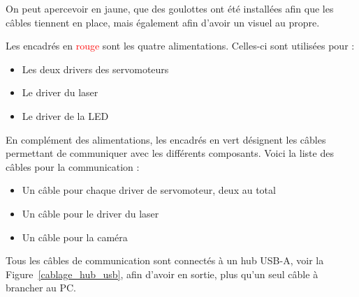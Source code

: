 On peut apercevoir en \textcolor[RGB]{230, 230, 0}{jaune}, que des goulottes ont été installées afin que les câbles tiennent en place, mais également afin d'avoir un visuel au propre.

Les encadrés en \textcolor{red}{rouge} sont les quatre alimentations. Celles-ci sont utilisées pour :
\begin{itemize}[label=\textbullet]
    \item Les deux drivers des servomoteurs
    \item Le driver du laser
    \item Le driver de la LED
\end{itemize}
\vspace{0.5em}
En complément des alimentations, les encadrés en \textcolor[RGB]{0, 201, 18}{vert} désignent les câbles permettant de communiquer avec les différents composants. Voici la liste des câbles pour la communication :
\begin{itemize}[label=\textbullet]
    \item Un câble pour chaque driver de servomoteur, deux au total
    \item Un câble pour le driver du laser
    \item Un câble pour la caméra
\end{itemize}
\vspace{0.5em}
Tous les câbles de communication sont connectés à un hub USB-A, voir la Figure~\ref{cablage_hub_usb}, afin d'avoir en sortie, plus qu'un seul câble à brancher au PC.